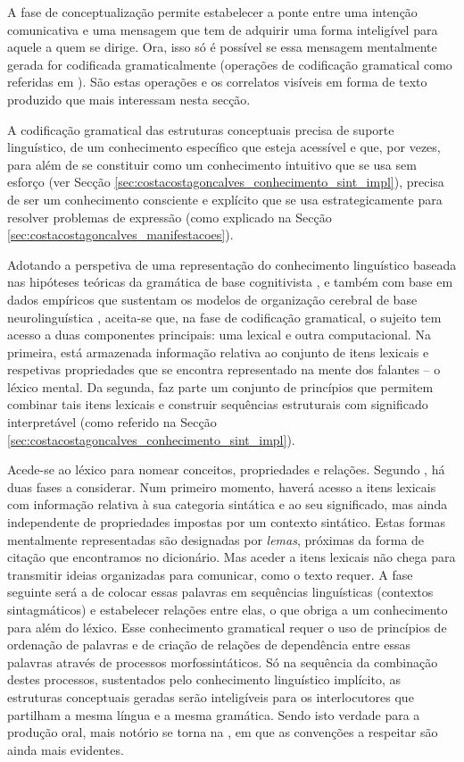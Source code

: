 \documentclass[output=paper]{LSP/langsci}
\begin{document}
A fase de conceptualização permite estabelecer a ponte entre uma intenção comunicativa e uma mensagem que tem de adquirir uma forma inteligível para aquele a quem se dirige. Ora, isso só é possível se essa mensagem mentalmente gerada for codificada gramaticalmente (operações de codificação gramatical como referidas em \citealt{bocklevelt2002}). São estas operações e os correlatos visíveis em forma de texto produzido que mais interessam nesta secção. 

A codificação gramatical das estruturas conceptuais precisa de suporte linguístico, de um conhecimento específico que esteja acessível e que, por vezes, para além de se constituir como um conhecimento intuitivo que se usa sem esforço (ver Secção \ref{sec:costacostagoncalves_conhecimento_sint_impl}), precisa de ser um conhecimento consciente e explícito que se usa estrategicamente para resolver problemas de expressão (como explicado na Secção \ref{sec:costacostagoncalves_manifestacoes}).

Adotando a perspetiva de uma representação do conhecimento linguístico baseada nas hipóteses teóricas da gramática de base cognitivista \citep{chomsky1986}, e também com base em dados empíricos que sustentam os modelos de organização cerebral de base neurolinguística \citep{ullman2001}, aceita-se que, na fase de codificação gramatical, o sujeito tem acesso a duas componentes principais: uma lexical e outra computacional. Na primeira, está armazenada informação relativa ao conjunto de itens lexicais e respetivas propriedades que se encontra representado na mente dos falantes – o léxico mental. Da segunda, faz parte um conjunto de princípios que permitem combinar tais itens lexicais e construir sequências estruturais com significado interpretável (como referido na Secção \ref{sec:costacostagoncalves_conhecimento_sint_impl}).

Acede-se ao léxico para nomear conceitos, propriedades e relações. Segundo \citet{levelt1989}, há duas fases a considerar. Num primeiro momento, haverá acesso a itens lexicais com informação relativa à sua categoria sintática e ao seu significado, mas ainda independente de propriedades impostas por um contexto sintático. Estas formas mentalmente representadas são designadas por \textit{lemas}, próximas da forma de citação que encontramos no dicionário. Mas aceder a itens lexicais não chega para transmitir ideias organizadas para comunicar, como o texto requer. A fase seguinte será a de colocar essas palavras em sequências linguísticas (contextos sintagmáticos) e estabelecer relações entre elas, o que obriga a um conhecimento para além do léxico. Esse conhecimento gramatical requer o uso de princípios de ordenação de palavras e de criação de relações de dependência entre essas palavras através de processos morfossintáticos. Só na sequência da combinação destes processos, sustentados pelo conhecimento linguístico implícito, as estruturas conceptuais geradas serão inteligíveis para os interlocutores que partilham a mesma língua e a mesma gramática. Sendo isto verdade para a produção oral, mais notório se torna na , em que as convenções a respeitar são ainda mais evidentes. 
\end{document}
